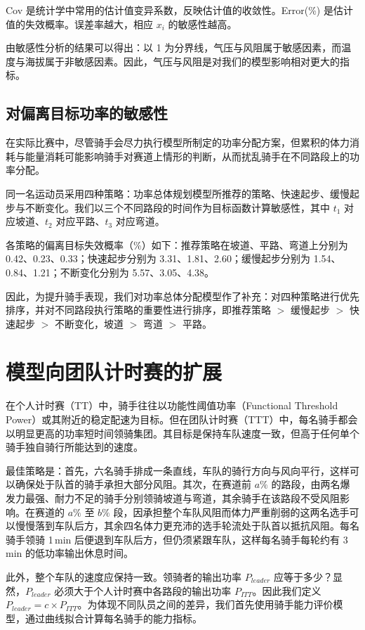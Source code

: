 \documentclass[11pt,a4paper]{ctexart}
\begin{document}
Cov 是统计学中常用的估计值变异系数，反映估计值的收敛性。Error(\%) 是估计值的失效概率。误差率越大，相应 $x_i$ 的敏感性越高。

由敏感性分析的结果可以得出：以 1 为分界线，气压与风阻属于敏感因素，而温度与海拔属于非敏感因素。因此，气压与风阻是对我们的模型影响相对更大的指标。

\subsection{对偏离目标功率的敏感性}

在实际比赛中，尽管骑手会尽力执行模型所制定的功率分配方案，但累积的体力消耗与能量消耗可能影响骑手对赛道上情形的判断，从而扰乱骑手在不同路段上的功率分配。

同一名运动员采用四种策略：功率总体规划模型所推荐的策略、快速起步、缓慢起步与不断变化。我们以三个不同路段的时间作为目标函数计算敏感性，其中 $t_1$ 对应坡道、$t_2$ 对应平路、$t_3$ 对应弯道。

各策略的偏离目标失效概率（\%）如下：推荐策略在坡道、平路、弯道上分别为 0.42、0.23、0.33；快速起步分别为 3.31、1.81、2.60；缓慢起步分别为 1.54、0.84、1.21；不断变化分别为 5.57、3.05、4.38。

因此，为提升骑手表现，我们对功率总体分配模型作了补充：对四种策略进行优先排序，并对不同路段执行策略的重要性进行排序，即推荐策略 $>$ 缓慢起步 $>$ 快速起步 $>$ 不断变化，坡道 $>$ 弯道 $>$ 平路。

\section{模型向团队计时赛的扩展}

在个人计时赛（TT）中，骑手往往以功能性阈值功率（Functional Threshold Power）或其附近的稳定配速为目标。但在团队计时赛（TTT）中，每名骑手都会以明显更高的功率短时间领骑集团。其目标是保持车队速度一致，但高于任何单个骑手独自骑行所能达到的速度。

最佳策略是：首先，六名骑手排成一条直线，车队的骑行方向与风向平行，这样可以确保处于队首的骑手承担大部分风阻。其次，在赛道前 $a\%$ 的路段，由两名爆发力最强、耐力不足的骑手分别领骑坡道与弯道，其余骑手在该路段不受风阻影响。在赛道的 $a\%$ 至 $b\%$ 段，因承担整个车队风阻而体力严重削弱的这两名选手可以慢慢落到车队后方，其余四名体力更充沛的选手轮流处于队首以抵抗风阻。每名骑手领骑 1\,min 后便退到车队后方，但仍须紧跟车队，这样每名骑手每轮约有 3\,min 的低功率输出休息时间。

此外，整个车队的速度应保持一致。领骑者的输出功率 $P_{leader}$ 应等于多少？显然，$P_{leader}$ 必须大于个人计时赛中各路段的输出功率 $P_{ITT}$。因此我们定义 $P_{leader}=c\times P_{ITT}$。为体现不同队员之间的差异，我们首先使用骑手能力评价模型，通过曲线拟合计算每名骑手的能力指标。
\end{document}
